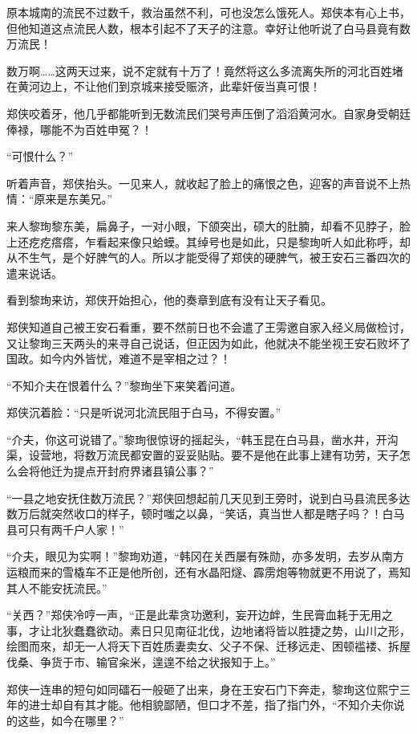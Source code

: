 原本城南的流民不过数千，救治虽然不利，可也没怎么饿死人。郑侠本有心上书，但他知道这点流民人数，根本引起不了天子的注意。幸好让他听说了白马县竟有数万流民！

数万啊……这两天过来，说不定就有十万了！竟然将这么多流离失所的河北百姓堵在黄河边上，不让他们到京城来接受赈济，此辈奸佞当真可恨！

郑侠咬着牙，他几乎都能听到无数流民们哭号声压倒了滔滔黄河水。自家身受朝廷俸禄，哪能不为百姓申冤？！

“可恨什么？”

听着声音，郑侠抬头。一见来人，就收起了脸上的痛恨之色，迎客的声音说不上热情：“原来是东美兄。”

来人黎珣黎东美，扁鼻子，一对小眼，下颌突出，硕大的肚腩，却看不见脖子，脸上还疙疙瘩瘩，乍看起来像只蛤蟆。其绰号也是如此，只是黎珣听人如此称呼，却从不生气，是个好脾气的人。所以才能受得了郑侠的硬脾气，被王安石三番四次的遣来说话。

看到黎珣来访，郑侠开始担心，他的奏章到底有没有让天子看见。

郑侠知道自己被王安石看重，要不然前日也不会遣了王雱邀自家入经义局做检讨，又让黎珣三天两头的来寻自己说话，但正因为如此，他就决不能坐视王安石败坏了国政。如今内外皆忧，难道不是宰相之过？！

“不知介夫在恨着什么？”黎珣坐下来笑着问道。

郑侠沉着脸：“只是听说河北流民阻于白马，不得安置。”

“介夫，你这可说错了。”黎珣很惊讶的摇起头，“韩玉昆在白马县，凿水井，开沟渠，设营地，将数万流民都安置的妥妥贴贴。要不是他在此事上建有功劳，天子怎么会将他迁为提点开封府界诸县镇公事？”

“一县之地安抚住数万流民？”郑侠回想起前几天见到王旁时，说到白马县流民多达数万后就突然收口的样子，顿时嗤之以鼻，“笑话，真当世人都是瞎子吗？！白马县可只有两千户人家！”

“介夫，眼见为实啊！”黎珣劝道，“韩冈在关西屡有殊勋，亦多发明，去岁从南方运粮而来的雪橇车不正是他所创，还有水晶阳燧、霹雳炮等物就更不用说了，焉知其人不能安抚流民。”

“关西？”郑侠冷哼一声，“正是此辈贪功邀利，妄开边衅，生民膏血耗于无用之事，才让北狄蠢蠢欲动。素日只见南征北伐，边地诸将皆以胜捷之势，山川之形，绘图而來，却无一人将天下百姓质妻卖女、父子不保、迁移远走、困顿褴褛、拆屋伐桑、争货于市、输官籴米，遑遑不给之状报知于上。”

郑侠一连串的短句如同礌石一般砸了出来，身在王安石门下奔走，黎珣这位熙宁三年的进士却自有其才能。他相貌鄙陋，但口才不差，指了指门外，“不知介夫你说的这些，如今在哪里？”

